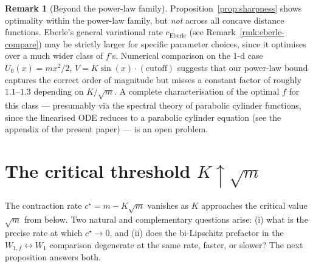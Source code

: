 \documentclass[11pt]{article}
\theoremstyle{definition}
\newtheorem{remark}[theorem]{Remark}
\begin{document}
\begin{remark}[Beyond the power-law family]
Proposition~\ref{prop:sharpness} shows optimality within the power-law family, but \emph{not} across all concave distance functions. Eberle's general variational rate $c_{\mathrm{Eberle}}$ (see Remark~\ref{rmk:eberle-compare}) may be strictly larger for specific parameter choices, since it optimises over a much wider class of $f$'s. Numerical comparison on the 1-d case $U_0(x) = m x^2/2$, $V = K\sin(x)\cdot(\text{cutoff})$ suggests that our power-law bound captures the correct order of magnitude but misses a constant factor of roughly $1.1$--$1.3$ depending on $K/\sqrt m$. A complete characterisation of the optimal $f$ for this class --- presumably via the spectral theory of parabolic cylinder functions, since the linearised ODE reduces to a parabolic cylinder equation (see the appendix of the present paper) --- is an open problem.
\end{remark}

\section{The critical threshold $K \uparrow \sqrt m$}\label{sec:critical}

The contraction rate $c^\star = m - K\sqrt m$ vanishes as $K$ approaches the critical value $\sqrt m$ from below. Two natural and complementary questions arise: (i) what is the precise rate at which $c^\star \to 0$, and (ii) does the bi-Lipschitz prefactor in the $W_{1,f} \leftrightarrow W_1$ comparison degenerate at the same rate, faster, or slower? The next proposition answers both.
\end{document}
